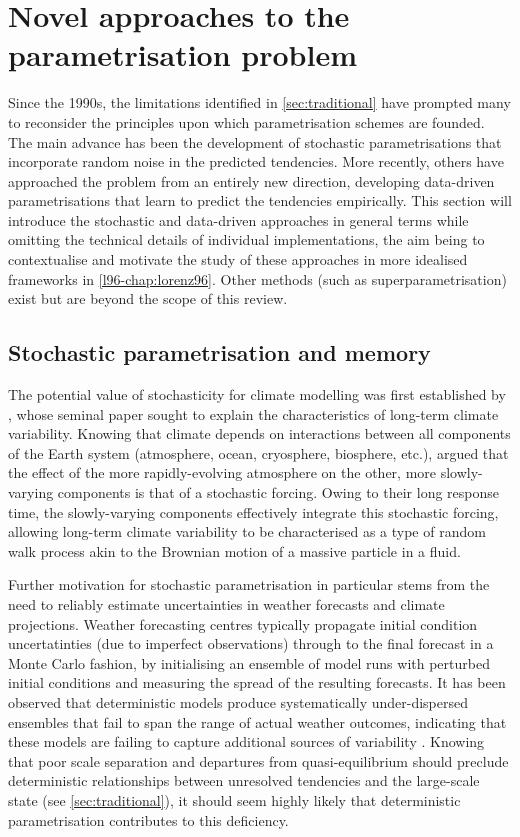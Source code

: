 \documentclass[../main.tex]{subfiles}
\begin{document}
\section{Novel approaches to the parametrisation problem}%
\label{sec:novel}
Since the 1990s, the limitations identified in \cref{sec:traditional} have
prompted many to reconsider the principles upon which parametrisation schemes
are founded. The main advance has been the development of stochastic
parametrisations that incorporate random noise in the predicted tendencies.
More recently, others have approached the problem from an entirely new
direction, developing data-driven parametrisations that learn to predict the
tendencies empirically. This section will introduce the stochastic and
data-driven approaches in general terms while omitting the technical details of
individual implementations, the aim being to contextualise and motivate the
study of these approaches in more idealised frameworks in \cref{l96-chap:lorenz96}.
Other methods (such as superparametrisation) exist but are beyond the scope of
this review.


\subsection{Stochastic parametrisation and memory} \label{sec:stochastic}
The potential value of stochasticity for climate modelling was first
established by \textcite{hasselmann1976}, whose seminal paper sought to explain
the characteristics of long-term climate variability. Knowing that climate
depends on interactions between all components of the Earth system
(atmosphere, ocean, cryosphere, biosphere, etc.), \citeauthor{hasselmann1976}
argued that the effect of the more rapidly-evolving atmosphere on the other,
more slowly-varying components is that of a stochastic forcing. Owing to
their long response time, the slowly-varying components effectively integrate
this stochastic forcing, allowing long-term climate variability to be
characterised as a type of random walk process akin to the Brownian motion
of a massive particle in a fluid.

Further motivation for stochastic parametrisation in particular stems from the
need to reliably estimate uncertainties in weather forecasts and climate
projections. Weather forecasting centres typically propagate initial condition
uncertatinties (due to imperfect observations) through to the final forecast in
a Monte Carlo fashion, by initialising an ensemble of model runs with perturbed
initial conditions and measuring the spread of the resulting forecasts. It has
been observed that deterministic models produce systematically under-dispersed
ensembles that fail to span the range of actual weather outcomes, indicating
that these models are failing to capture additional sources of variability
\parencite{palmer2005,berner2017,palmer2019}. Knowing that poor scale
separation and departures from quasi-equilibrium should preclude deterministic
relationships between unresolved tendencies and the large-scale state (see
\cref{sec:traditional}), it should seem highly likely that deterministic
parametrisation contributes to this deficiency.
\end{document}
